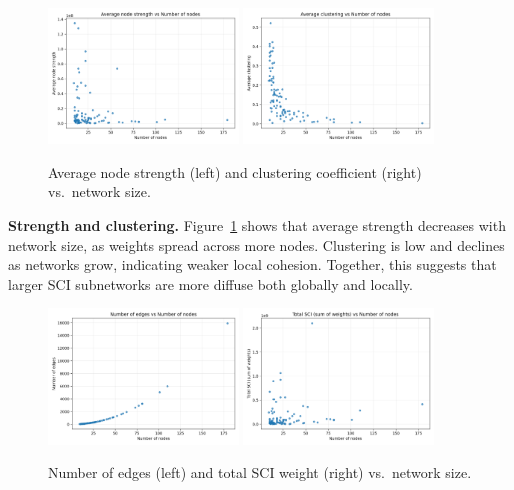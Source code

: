 \begin{figure}[h!]
    \centering
    \includegraphics[width=0.45\textwidth]{images/TASK3/metrics_avg_strength_vs_n_nodes.png}
    \includegraphics[width=0.45\textwidth]{images/TASK3/metrics_avg_clustering_vs_n_nodes.png}
    \caption{Average node strength (left) and clustering coefficient (right) vs.\ network size.}
    \label{fig:strength_clustering}
\end{figure}

\textbf{Strength and clustering.}  
Figure~\ref{fig:strength_clustering} shows that average strength decreases with network size, as weights spread across more nodes.  
Clustering is low and declines as networks grow, indicating weaker local cohesion.  
Together, this suggests that larger SCI subnetworks are more diffuse both globally and locally.

\begin{figure}[h!]
    \centering
    \includegraphics[width=0.45\textwidth]{images/TASK3/metrics_n_edges_vs_n_nodes.png}
    \includegraphics[width=0.45\textwidth]{images/TASK3/total_sci_vs_n_nodes.png}
    \caption{Number of edges (left) and total SCI weight (right) vs.\ network size.}
    \label{fig:edges_weight}
\end{figure}

